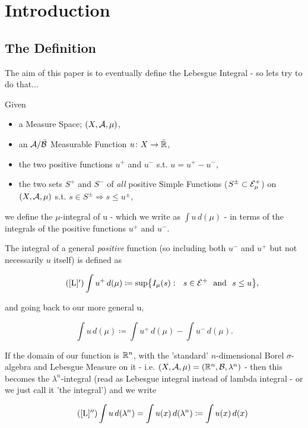 \section{Introduction} \label{intro}
\subsection{The Definition} \label{sec:def}

The aim of this paper is to eventually define the Lebesgue Integral - so lets try to do that...
\begin{definition}
	Given
	\begin{itemize}
		\item a Measure Space; $(X, \mathcal{A}, \mu)$,
		\item an $\mathcal{A}/\bar {\mathcal{B}}$ Measurable Function $u\colon X \rightarrow \bar {\mathbb{R}}$,
		\item the two positive functions $u^+$ and $u^-$ s.t. $u = u^+ - u^-$,
		\item the two sets $S^+$ and $S^-$ of {\em all} positive Simple Functions ($S^{\pm} \subset \mathcal{E}_\mu^+$) on $(X, \mathcal{A}, \mu)$ s.t. $s \in S^{\pm} \Rightarrow s \leq u^{\pm}$,
	\end{itemize}

	we define the $\mu$-integral of u - which we write as $\int u\,d(\mu)$ - in terms of the integrals of the positive functions $u^+$ and 			$u^-$. 

	The integral of a general {\em positive} function (so including both $u^-$ and $u^+$ but not necessarily $u$ itself) is defined as

	\begin{equation*}\label{posint}\tag{\ref{L}$'$}
	\int u^+\,d(\mu) \coloneqq \sup\bigr\{ I_\mu(s) : \ \  s \in \E^+ \hbox{ \ and \ } s \le u \bigl\},
	\end{equation*}

	and going back to our more general u, 

	\begin{equation}\label{L}
	\int u\,d(\mu) \coloneqq \int u^+\,d(\mu) - \int u^-\,d(\mu).
	\end{equation}

	If the domain of our function is $\mathbb{R}^n$, with the 'standard' $n$-dimensional Borel $\sigma$-algebra and Lebesgue Measure on it - i.e. $(X, \mathcal{A}, \mu) 	= (\mathbb{R}^n, \mathcal{B}, \lambda^n)$ - then this becomes the $\lambda^n$-integral (read as Lebesgue integral instead of lambda integral - or we just 			call it 'the integral') and we write

	\begin{equation*} \tag{\ref{L}$''$}
	\int u\,d(\lambda^n) =  \int u(x)\,d(\Ln) \coloneqq \int u(x)\,d(x) 
	\end{equation*}
	\vskip 5pt
\end{definition}
